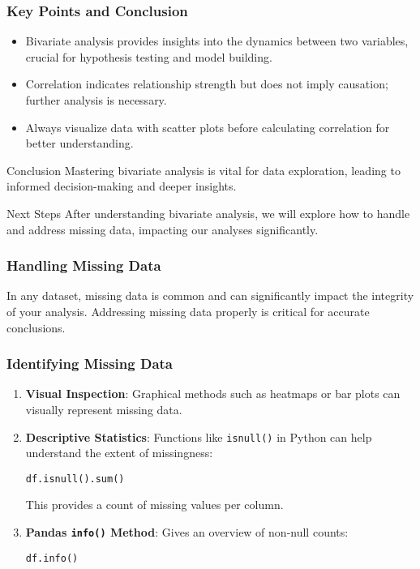 \documentclass{beamer}
\begin{document}
\begin{frame}[fragile]
    \frametitle{Key Points and Conclusion}
    \begin{itemize}
        \item Bivariate analysis provides insights into the dynamics between two variables, crucial for hypothesis testing and model building.
        \item Correlation indicates relationship strength but does not imply causation; further analysis is necessary.
        \item Always visualize data with scatter plots before calculating correlation for better understanding.
    \end{itemize}

    \begin{block}{Conclusion}
        Mastering bivariate analysis is vital for data exploration, leading to informed decision-making and deeper insights.
    \end{block}

    \begin{block}{Next Steps}
        After understanding bivariate analysis, we will explore how to handle and address missing data, impacting our analyses significantly.
    \end{block}
\end{frame}

\begin{frame}[fragile]
    \frametitle{Handling Missing Data}
    In any dataset, missing data is common and can significantly impact the integrity of your analysis. 
    Addressing missing data properly is critical for accurate conclusions. 
\end{frame}

\begin{frame}[fragile]
    \frametitle{Identifying Missing Data}
    \begin{enumerate}
        \item \textbf{Visual Inspection}: Graphical methods such as heatmaps or bar plots can visually represent missing data.
        \item \textbf{Descriptive Statistics}: Functions like \texttt{isnull()} in Python can help understand the extent of missingness:
        \begin{lstlisting}
df.isnull().sum()
        \end{lstlisting}
        This provides a count of missing values per column.
        \item \textbf{Pandas \texttt{info()} Method}: Gives an overview of non-null counts:
        \begin{lstlisting}
df.info()
        \end{lstlisting}
    \end{enumerate}
\end{frame}
\end{document}
